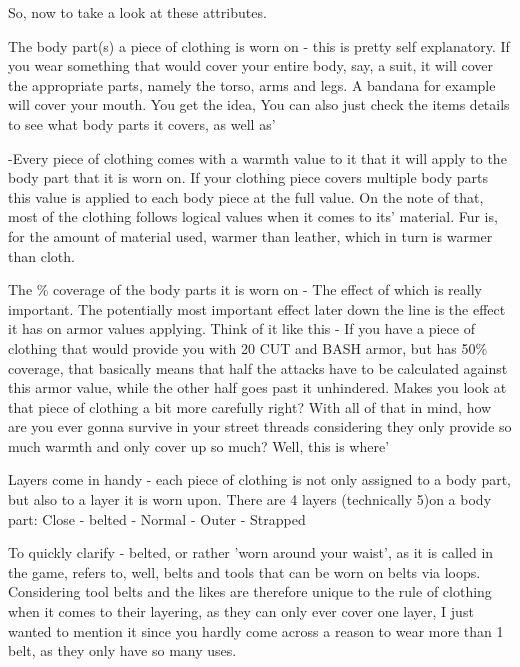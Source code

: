 \documentclass[11pt]{report}
\begin{document}
So, now to take a look at these attributes.

The body part(s) a piece of clothing is worn on - this is pretty self explanatory. If you wear something that would cover your entire body, say, a suit, it will cover the appropriate parts, namely the torso, arms and legs. A bandana for example will cover your mouth. You get the idea, You can also just check the items details to see what body parts it covers, as well as'

-Every piece of clothing comes with a warmth value to it that it will apply to the body part that it is worn on. If your clothing piece covers multiple body parts this value is applied to each body piece at the full value. On the note of that, most of the clothing follows logical values when it comes to its' material. Fur is, for the amount of material used, warmer than leather, which in turn is warmer than cloth.

The \% coverage of the body parts it is worn on - The effect of which is really important.
The potentially most important effect later down the line is the effect it has on armor values applying. Think of it like this - If you have a piece of clothing that would provide you with 20 CUT and BASH armor, but has 50\% coverage, that basically means that half the attacks have to be calculated against this armor value, while the other half goes past it unhindered. Makes you look at that piece of clothing a bit more carefully right? With all of that in mind, how are you ever gonna survive in your street threads considering they only provide so much warmth and only cover up so much? Well, this is where'

Layers come in handy - each piece of clothing is not only assigned to a body part, but also to a layer it is worn upon.
There are 4 layers (technically 5)on a body part: Close - belted - Normal - Outer - Strapped

To quickly clarify - belted, or rather 'worn around your waist', as it is called in the game, refers to, well, belts and tools that can be worn on belts via loops. Considering tool belts and the likes are therefore unique to the rule of clothing when it comes to their layering, as they can only ever cover one layer, I just wanted to mention it since you hardly come across a reason to wear more than 1 belt, as they only have so many uses.
\end{document}
